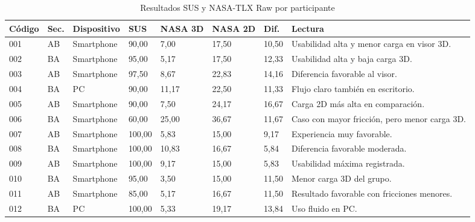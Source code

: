 \begin{table}[H]
    \caption{Resultados SUS y NASA-TLX Raw por participante}
    \label{tab:validacion_sus_nasa_participantes}
    \centering
    \scriptsize
    \begin{tabular}{p{1.2cm}p{0.9cm}p{1.6cm}p{0.9cm}p{1.3cm}p{1.3cm}p{1.3cm}p{3.4cm}}
        \hline
        \textbf{Código} & \textbf{Sec.} & \textbf{Dispositivo} & \textbf{SUS} & \textbf{NASA 3D} & \textbf{NASA 2D} & \textbf{Dif.} & \textbf{Lectura} \\ \hline
        001 & AB & Smartphone & 90,00 & 7,00 & 17,50 & 10,50 & Usabilidad alta y menor carga en visor 3D. \\
        002 & BA & Smartphone & 95,00 & 5,17 & 17,50 & 12,33 & Usabilidad alta y baja carga 3D. \\
        003 & AB & Smartphone & 97,50 & 8,67 & 22,83 & 14,16 & Diferencia favorable al visor. \\
        004 & BA & PC & 90,00 & 11,17 & 22,50 & 11,33 & Flujo claro también en escritorio. \\
        005 & AB & Smartphone & 90,00 & 7,50 & 24,17 & 16,67 & Carga 2D más alta en comparación. \\
        006 & BA & Smartphone & 60,00 & 25,00 & 36,67 & 11,67 & Caso con mayor fricción, pero menor carga 3D. \\
        007 & AB & Smartphone & 100,00 & 5,83 & 15,00 & 9,17 & Experiencia muy favorable. \\
        008 & BA & Smartphone & 100,00 & 10,83 & 16,67 & 5,84 & Diferencia favorable moderada. \\
        009 & AB & Smartphone & 100,00 & 9,17 & 15,00 & 5,83 & Usabilidad máxima registrada. \\
        010 & BA & Smartphone & 95,00 & 3,50 & 15,00 & 11,50 & Menor carga 3D del grupo. \\
        011 & AB & Smartphone & 85,00 & 5,17 & 16,67 & 11,50 & Resultado favorable con fricciones menores. \\
        012 & BA & PC & 100,00 & 5,33 & 19,17 & 13,84 & Uso fluido en PC. \\ \hline
    \end{tabular}
    \par\vspace{0.5\baselineskip}
\end{table}

